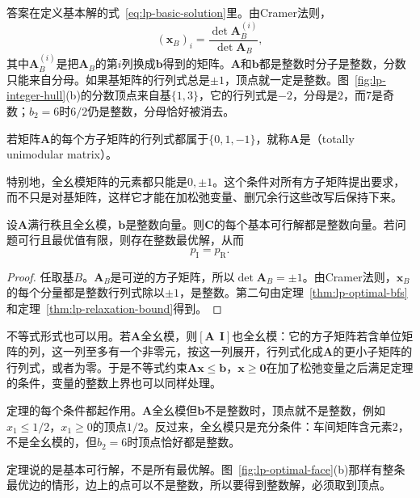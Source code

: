 答案在定义基本解的式~\eqref{eq:lp-basic-solution}里。由Cramer法则，
\[
 (\bm{x}_B)_i=\frac{\det\bm{A}_B^{(i)}}{\det\bm{A}_B},
\]
其中$\bm{A}_B^{(i)}$是把$\bm{A}_B$的第$i$列换成$\bm{b}$得到的矩阵。$\bm{A}$和$\bm{b}$都是整数时分子是整数，分数只能来自分母。如果基矩阵的行列式总是$\pm1$，顶点就一定是整数。图~\ref{fig:lp-integer-hull}(b)的分数顶点来自基$\{1,3\}$，它的行列式是$-2$，分母是$2$，而$7$是奇数；$b_2=6$时$6/2$仍是整数，分母恰好被消去。

\begin{definition}[全幺模矩阵]
 \label{def:lp-tu}
 若矩阵$\bm{A}$的每个方子矩阵的行列式都属于$\{0,1,-1\}$，就称$\bm{A}$是（totally unimodular matrix）。
\end{definition}

特别地，全幺模矩阵的元素都只能是$0,\pm1$。这个条件对所有方子矩阵提出要求，而不只是对基矩阵，这样它才能在加松弛变量、删冗余行这些改写后保持下来。

\begin{theorem}[全幺模与整数顶点]
 \label{thm:lp-tu-integral}
 设$\bm{A}$满行秩且全幺模，$\bm{b}$是整数向量。则$\bm{C}$的每个基本可行解都是整数向量。若问题可行且最优值有限，则存在整数最优解，从而
 \begin{equation}
  p_{\mathrm{I}}=p_{\mathrm{R}}.
  \label{eq:lp-tu-exact}
 \end{equation}
\end{theorem}

\begin{proof}
 任取基$B$。$\bm{A}_B$是可逆的方子矩阵，所以$\det\bm{A}_B=\pm1$。由Cramer法则，$\bm{x}_B$的每个分量都是整数行列式除以$\pm1$，是整数。第二句由定理~\ref{thm:lp-optimal-bfs}和定理~\ref{thm:lp-relaxation-bound}得到。
\end{proof}

不等式形式也可以用。若$\bm{A}$全幺模，则$[\bm{A}\ \ \bm{I}]$也全幺模：它的方子矩阵若含单位矩阵的列，这一列至多有一个非零元，按这一列展开，行列式化成$\bm{A}$的更小子矩阵的行列式，或者为零。于是不等式约束$\bm{A}\bm{x}\leq\bm{b}$，$\bm{x}\geq\bm{0}$在加了松弛变量之后满足定理的条件，变量的整数上界也可以同样处理。

定理的每个条件都起作用。$\bm{A}$全幺模但$\bm{b}$不是整数时，顶点就不是整数，例如$x_1\leq1/2$，$x_1\geq0$的顶点$1/2$。反过来，全幺模只是充分条件：车间矩阵含元素$2$，不是全幺模的，但$b_2=6$时顶点恰好都是整数。

定理说的是基本可行解，不是所有最优解。图~\ref{fig:lp-optimal-face}(b)那样有整条最优边的情形，边上的点可以不是整数，所以要得到整数解，必须取到顶点。

